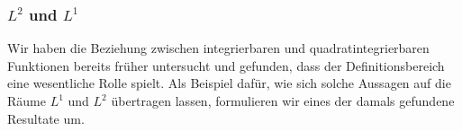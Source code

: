 


\subsubsection{$L^2$ und $L^1$}
Wir haben die Beziehung zwischen integrierbaren und quadratintegrierbaren
Funktionen bereits früher untersucht und gefunden, dass der Definitionsbereich
eine wesentliche Rolle spielt.
Als Beispiel dafür, wie sich solche Aussagen auf die Räume $L^1$ und $L^2$
übertragen lassen, formulieren wir eines der damals gefundene Resultate um.

